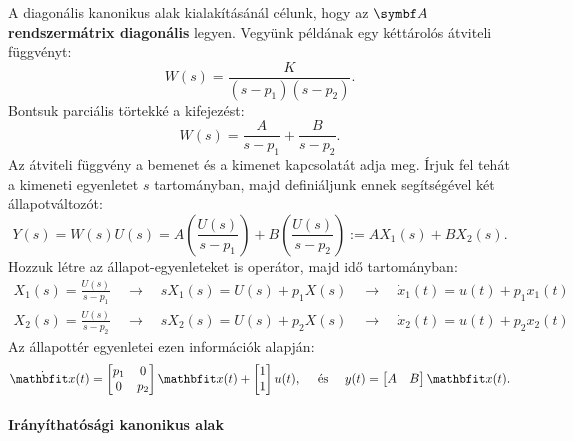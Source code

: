 A diagonális kanonikus alak kialakításánál célunk, hogy az $\rmat A$
\textbf{rendszermátrix diagonális} legyen. Vegyünk példának egy kéttárolós
átviteli függvényt:
\begin{equation}
  W(s) = \frac{K}{(s - p_1)(s- p_2)}.
\end{equation}
Bontsuk parciális törtekké a kifejezést:
\begin{equation}
  W(s) = \frac{A}{s - p_1} + \frac{B}{s - p_2}.
\end{equation}
Az átviteli függvény a bemenet és a kimenet kapcsolatát adja meg. Írjuk fel
tehát a kimeneti egyenletet $s$ tartományban, majd definiáljunk ennek
segítségével két állapotváltozót:
\begin{equation}
  Y(s)
  = W(s) U(s)
  = A \left( \frac{U(s)}{s - p_1} \right)
  + B \left( \frac{U(s)}{s - p_2} \right)
  := A X_1(s) + B X_2(s)
  .
\end{equation}
Hozzuk létre az állapot-egyenleteket is operátor, majd idő tartományban:
\begin{gather}
  X_1(s) = \frac{U(s)}{s - p_1}
  \quad \rightarrow \quad
  s X_1(s) = U(s) + p_1 X(s)
  \quad \rightarrow \quad
  \dot x_1(t) = u(t) + p_1 x_1(t)
  \\
  X_2(s) = \frac{U(s)}{s - p_2}
  \quad \rightarrow \quad
  s X_2(s) = U(s) + p_2 X(s)
  \quad \rightarrow \quad
  \dot x_2(t) = u(t) + p_2 x_2(t)
\end{gather}
Az állapottér egyenletei ezen információk alapján:
\begin{equation}
  \dot{\rvec x}(t) = \begin{bmatrix}
    p_1 & 0 \\ 0 & p_2
  \end{bmatrix} \rvec x(t) + \begin{bmatrix}
    1 \\ 1
  \end{bmatrix} u(t),
  \quad \text{ és } \quad
  y(t) = \begin{bmatrix}
    A & B
  \end{bmatrix} \rvec x(t).
\end{equation}

\paragraph{Irányíthatósági kanonikus alak}

